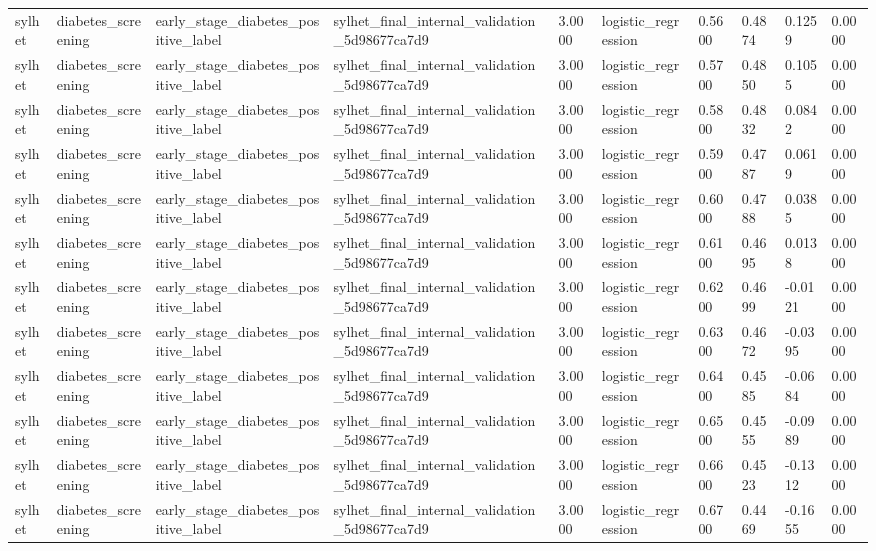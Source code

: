 \begin{tabular}{llllllllll}
sylhet & diabetes\_screening & early\_stage\_diabetes\_positive\_label & sylhet\_final\_internal\_validation\_5d98677ca7d9 & 3.0000 & logistic\_regression & 0.5600 & 0.4874 & 0.1259 & 0.0000 \\
sylhet & diabetes\_screening & early\_stage\_diabetes\_positive\_label & sylhet\_final\_internal\_validation\_5d98677ca7d9 & 3.0000 & logistic\_regression & 0.5700 & 0.4850 & 0.1055 & 0.0000 \\
sylhet & diabetes\_screening & early\_stage\_diabetes\_positive\_label & sylhet\_final\_internal\_validation\_5d98677ca7d9 & 3.0000 & logistic\_regression & 0.5800 & 0.4832 & 0.0842 & 0.0000 \\
sylhet & diabetes\_screening & early\_stage\_diabetes\_positive\_label & sylhet\_final\_internal\_validation\_5d98677ca7d9 & 3.0000 & logistic\_regression & 0.5900 & 0.4787 & 0.0619 & 0.0000 \\
sylhet & diabetes\_screening & early\_stage\_diabetes\_positive\_label & sylhet\_final\_internal\_validation\_5d98677ca7d9 & 3.0000 & logistic\_regression & 0.6000 & 0.4788 & 0.0385 & 0.0000 \\
sylhet & diabetes\_screening & early\_stage\_diabetes\_positive\_label & sylhet\_final\_internal\_validation\_5d98677ca7d9 & 3.0000 & logistic\_regression & 0.6100 & 0.4695 & 0.0138 & 0.0000 \\
sylhet & diabetes\_screening & early\_stage\_diabetes\_positive\_label & sylhet\_final\_internal\_validation\_5d98677ca7d9 & 3.0000 & logistic\_regression & 0.6200 & 0.4699 & -0.0121 & 0.0000 \\
sylhet & diabetes\_screening & early\_stage\_diabetes\_positive\_label & sylhet\_final\_internal\_validation\_5d98677ca7d9 & 3.0000 & logistic\_regression & 0.6300 & 0.4672 & -0.0395 & 0.0000 \\
sylhet & diabetes\_screening & early\_stage\_diabetes\_positive\_label & sylhet\_final\_internal\_validation\_5d98677ca7d9 & 3.0000 & logistic\_regression & 0.6400 & 0.4585 & -0.0684 & 0.0000 \\
sylhet & diabetes\_screening & early\_stage\_diabetes\_positive\_label & sylhet\_final\_internal\_validation\_5d98677ca7d9 & 3.0000 & logistic\_regression & 0.6500 & 0.4555 & -0.0989 & 0.0000 \\
sylhet & diabetes\_screening & early\_stage\_diabetes\_positive\_label & sylhet\_final\_internal\_validation\_5d98677ca7d9 & 3.0000 & logistic\_regression & 0.6600 & 0.4523 & -0.1312 & 0.0000 \\
sylhet & diabetes\_screening & early\_stage\_diabetes\_positive\_label & sylhet\_final\_internal\_validation\_5d98677ca7d9 & 3.0000 & logistic\_regression & 0.6700 & 0.4469 & -0.1655 & 0.0000 \\

\end{tabular}
